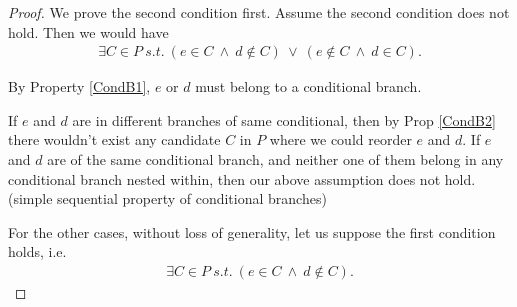         \begin{proof}

            We prove the second condition first. 
            Assume the second condition does not hold. Then we would have
            \begin{align*}
                \exists C \in P \ s.t. \ 
                (e \in C \ \wedge \ d \notin C) \ \vee \ 
                (e \notin C \ \wedge \ d \in C).
            \end{align*}
            
            By Property \ref{CondB1}, $e$ or $d$ must belong to a conditional branch. 
            
            If $e$ and $d$ are in different branches of same conditional, then by Prop \ref{CondB2} there wouldn't exist any candidate $C$ in $P$ where we could reorder $e$ and $d$. 
            If $e$ and $d$ are of the same conditional branch, and neither one of them belong in any conditional branch nested within, then our above assumption does not hold. (simple sequential property of conditional branches)
            
            For the other cases, without loss of generality, let us suppose the first condition holds, i.e. 
            \begin{align*}
                \exists C \in P \ s.t. \ 
                (e \in C \ \wedge \ d \notin C).
            \end{align*}


\end{proof}

